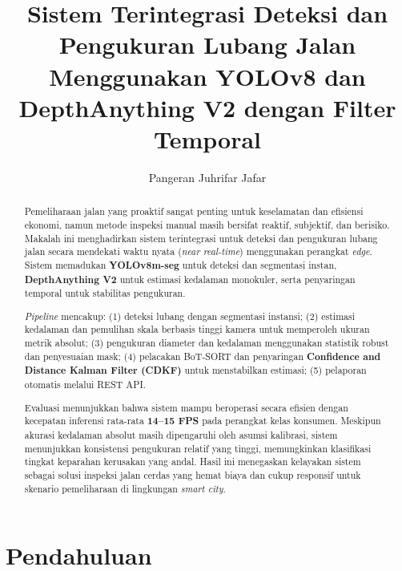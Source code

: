\documentclass{iopjournal}
\begin{document}

\title{\Huge Sistem Terintegrasi Deteksi dan Pengukuran Lubang Jalan Menggunakan YOLOv8 dan DepthAnything V2 dengan Filter Temporal}

\author{Pangeran Juhrifar Jafar}
\address{Jurusan Sistem Informasi, Universitas Hasanuddin, Makassar, Indonesia}


\begin{abstract}
\justify
\hspace{1.5em}Pemeliharaan jalan yang proaktif sangat penting untuk keselamatan dan efisiensi ekonomi, namun metode inspeksi manual masih bersifat reaktif, subjektif, dan berisiko. Makalah ini menghadirkan sistem terintegrasi untuk deteksi dan pengukuran lubang jalan secara mendekati waktu nyata (\textit{near real-time}) menggunakan perangkat \textit{edge}. Sistem memadukan \textbf{YOLOv8m-seg} untuk deteksi dan segmentasi instan, \textbf{DepthAnything V2} untuk estimasi kedalaman monokuler, serta penyaringan temporal untuk stabilitas pengukuran.

\hspace{1.5em}\textit{Pipeline} mencakup: (1) deteksi lubang dengan segmentasi instansi; (2) estimasi kedalaman dan pemulihan skala berbasis tinggi kamera untuk memperoleh ukuran metrik absolut; (3) pengukuran diameter dan kedalaman menggunakan statistik robust dan penyesuaian mask; (4) pelacakan BoT-SORT dan penyaringan \textbf{Confidence and Distance Kalman Filter (CDKF)} untuk menstabilkan estimasi; (5) pelaporan otomatis melalui REST API.

Evaluasi menunjukkan bahwa sistem mampu beroperasi secara efisien dengan kecepatan inferensi rata-rata \textbf{14--15 FPS} pada perangkat kelas konsumen. Meskipun akurasi kedalaman absolut masih dipengaruhi oleh asumsi kalibrasi, sistem menunjukkan konsistensi pengukuran relatif yang tinggi, memungkinkan klasifikasi tingkat keparahan kerusakan yang andal. Hasil ini menegaskan kelayakan sistem sebagai solusi inspeksi jalan cerdas yang hemat biaya dan cukup responsif untuk skenario pemeliharaan di lingkungan \textit{smart city}.
\end{abstract}


\justify %
\section{Pendahuluan}
\label{sec:introduction}
\end{document}
